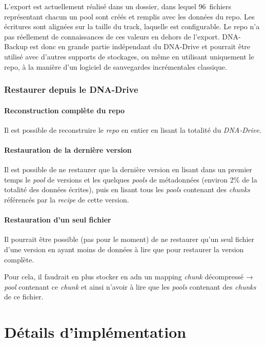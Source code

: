 \documentclass[a4paper]{report}
\begin{document}
L'export est actuellement réalisé dans un dossier, dans lequel 96~fichiers
représentant chacun un pool sont créés et remplis avec les données du repo.
Les écritures sont alignées sur la taille du track, laquelle est configurable.
Le repo n'a pas réellement de connaissances de ces valeurs en dehors de l'export.
DNA-Backup est donc en grande partie indépendant du DNA-Drive
et pourrait être utilisé avec d'autres supports de stockages,
ou même en utilisant uniquement le repo,
à la manière d'un logiciel de sauvegardes incrémentales classique.


\subsection{Restaurer depuis le DNA-Drive}

\subsubsection{Reconstruction complète du repo}

Il est possible de reconstruire le \emph{repo} en entier en lisant la
totalité du \emph{DNA-Drive}.

\subsubsection{Restauration de la dernière version}

Il est possible de ne restaurer que la dernière version en lisant dans
un premier temps le \emph{pool} de versions et les quelques \emph{pools}
de métadonnées (environ 2\% de la totalité des données écrites), puis en
lisant tous les \emph{pools} contenant des \emph{chunks} référencés par
la \emph{recipe} de cette version.

\subsubsection{Restauration d'un seul fichier}

Il pourrait être possible (pas pour le moment) de ne restaurer qu'un
seul fichier d'une version en ayant moins de données à lire que pour
restaurer la version complète.

Pour cela, il faudrait en plus stocker en \ac{adn} un mapping \emph{chunk}
décompressé → \emph{pool} contenant ce \emph{chunk} et ainsi n'avoir à
lire que les \emph{pools} contenant des \emph{chunks} de ce fichier.



\chapter{Détails d'implémentation}
\end{document}

